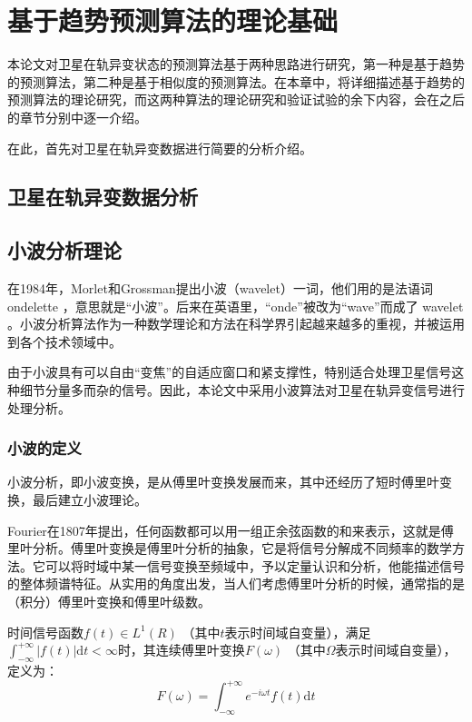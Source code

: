 
\chapter{基于趋势预测算法的理论基础}{\label{chap:topot}}
本论文对卫星在轨异变状态的预测算法基于两种思路进行研究，第一种是基于趋势的预测算法，第二种是基于相似度的预测算法。在本章中，将详细描述基于趋势的预测算法的理论研究，而这两种算法的理论研究和验证试验的余下内容，会在之后的章节分别中逐一介绍。

在此，首先对卫星在轨异变数据进行简要的分析介绍。
\section{卫星在轨异变数据分析} 

\section{小波分析理论}
在1984年，Morlet和Grossman提出小波（wavelet）一词，他们用的是法语词 ondelette ，意思就是“小波”。后来在英语里，“onde”被改为“wave”而成了 wavelet 。小波分析算法作为一种数学理论和方法在科学界引起越来越多的重视，并被运用到各个技术领域中。

由于小波具有可以自由“变焦”的自适应窗口和紧支撑性，特别适合处理卫星信号这种细节分量多而杂的信号。因此，本论文中采用小波算法对卫星在轨异变信号进行处理分析。

\subsection{小波的定义}
小波分析，即小波变换，是从傅里叶变换发展而来，其中还经历了短时傅里叶变换，最后建立小波理论。

Fourier在1807年提出，任何函数都可以用一组正余弦函数的和来表示，这就是傅里叶分析。傅里叶变换是傅里叶分析的抽象，它是将信号分解成不同频率的数学方法。它可以将时域中某一信号变换至频域中，予以定量认识和分析，他能描述信号的整体频谱特征。从实用的角度出发，当人们考虑傅里叶分析的时候，通常指的是（积分）傅里叶变换和傅里叶级数。

时间信号函数$ f(t) \in L^1(R) $ （其中$ t $表示时间域自变量），满足$ \int_{-\infty}^{+\infty}\left|f(t)\right|\mathrm{d}t < \infty $时，其连续傅里叶变换$ F(\omega) $ （其中$ \Omega $表示时间域自变量），定义为：
\begin{equation}
\label{equ:Fw}
	F(\omega) = \int_{-\infty}^{+\infty} e^{-i\omega t}f(t)\mathrm{d}t
\end{equation}

